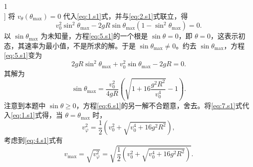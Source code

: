 \begin{solution}{1}
\begin{equation*}
\end{equation*}
]
将 $v_{\theta}(\theta_{\max})=0$ 代入\eqref{eq:1.s1}式，并与\eqref{eq:2.s1}式联立，得
\begin{equation}
v_{0}^{2} \sin^{2} \theta_{\max} - 2gR \sin \theta_{\max} \left(1 - \sin^{2} \theta_{\max}\right) = 0.
\label{eq:5.s1}
\end{equation}
以 $\sin \theta_{\max}$ 为未知量，方程\eqref{eq:5.s1}的一个根是 $\sin \theta = 0$，即 $\theta = 0$，这表示初态，其速率为最小值，不是所求的解。于是 $\sin \theta_{\max} \neq 0$。约去 $\sin \theta_{\max}$，方程\eqref{eq:5.s1}变为
\begin{equation}
2gR \sin^{2} \theta_{\max} + v_{0}^{2} \sin \theta_{\max} - 2gR = 0.
\label{eq:6.s1}
\end{equation}
其解为
\begin{equation}
\sin \theta_{\max} = \frac{v_{0}^{2}}{4gR}\left(\sqrt{1+16 \frac{g^{2} R^{2}}{v_{0}^{4}}} - 1\right).
\label{eq:7.s1}
\end{equation}
注意到本题中 $\sin \theta \geq 0$，方程\eqref{eq:6.s1}的另一解不合题意，舍去。将\eqref{eq:7.s1}式代入\eqref{eq:1.s1}式得，当 $\theta = \theta_{\max}$ 时，
\begin{equation}
v_{\varphi}^{2} = \frac{1}{2}\left(v_{0}^{2} + \sqrt{v_{0}^{4} + 16 g^{2} R^{2}}\right),
\label{eq:8.s1}
\end{equation}
考虑到\eqref{eq:4.s1}式有
\begin{equation}
v_{\max} = \sqrt{v_{\varphi}^{2}} = \sqrt{\frac{1}{2}\left(v_{0}^{2} + \sqrt{v_{0}^{4} + 16 g^{2} R^{2}}\right)}.
\label{eq:9.s1}
\end{equation}
\end{solution}
